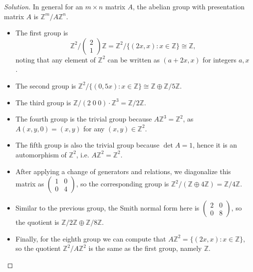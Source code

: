 \documentclass[10pt]{scrartcl}
\providecommand{\ZZ}{\mathbb Z}
\providecommand{\ii}{\item}
\newenvironment{soln}{\begin{proof}[Solution]}{\end{proof}}
\begin{document}
\begin{soln}
	In general for an $m\times n$ matrix $A$,
	the abelian group with presentation matrix $A$ is $\ZZ^m/A\ZZ^n$.
	\begin{itemize}
		\ii The first group is
		\[\ZZ^2/\begin{pmatrix}
			2\\1
		\end{pmatrix}\ZZ = \ZZ^2/\{(2x,x) : x\in\ZZ\} \cong \ZZ,\]
		noting that any element of $\ZZ^2$ can be written as
		$(a + 2x, x)$ for integers $a,x$.
		\ii The second group is
		$\ZZ^2/\{(0, 5x) : x\in\ZZ\}\cong\ZZ\oplus\ZZ/5\ZZ$.
		\ii The third group is $\ZZ/(2\;0\;0)\cdot\ZZ^3 = \ZZ/2\ZZ$.
		\ii The fourth group is the trivial group because
		$A\ZZ^3 = \ZZ^2$, as $A(x,y,0) = (x,y)$ for any $(x,y)\in\ZZ^2$.
		\ii The fifth group is also the trivial group because
		$\det A = 1$, hence it is an automorphism of $\ZZ^2$,
		i.e. $A\ZZ^2 = \ZZ^2$.
		\ii After applying a change of generators and relations,
		we diagonalize this matrix as
		$\begin{pmatrix}
			1&0\\0&4
		\end{pmatrix}$,
		so the corresponding group is
		$\ZZ^2/(\ZZ\oplus 4\ZZ) = \ZZ/4\ZZ$.
		\ii Similar to the previous group, the Smith normal form here is
		$\begin{pmatrix}
			2&0\\0&8
		\end{pmatrix}$, so the quotient is $\ZZ/2\ZZ\oplus\ZZ/8\ZZ$.
		\ii Finally, for the eighth group we can compute that
		$A\ZZ^2 = \{(2x,x) : x\in\ZZ\}$, so the quotient $\ZZ^2/A\ZZ^2$
		is the same as the first group, namely $\ZZ$.
	\end{itemize}
\end{soln}
\end{document}

